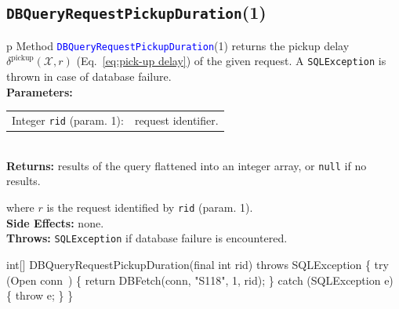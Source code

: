 \subsection{{\tt{}\protect{}DBQueryRequestPickupDuration}(1)}
\begin{tabular}{p{\textwidth}}
\toprule
{}
Method \textcolor{blue}{{\tt{}\protect{}DBQueryRequestPickupDuration}}(1) returns the
pickup delay $\delta^\textrm{pickup}(\mathcal{X},r)$
(Eq.~\ref{eq:pick-up delay}) of the given request.
A {\tt{}SQLException} is thrown in case of database failure.\\
\midrule
\textbf{Parameters:}\\
\begin{tabular}{lp{116mm}}
Integer {\tt{}rid} (param. 1):&request identifier.
\end{tabular}\\
\textbf{Returns:} results of the query flattened into an integer array,
or {\tt{}null} if no results.


where $r$ is the request identified by {\tt{}rid} (param. 1).\\
\textbf{Side Effects:} none.\\
\textbf{Throws:} {\tt{}SQLException} if database failure is encountered.\\
\bottomrule
\end{tabular}
\nwenddocs{}\endmoddef{}
int[] DBQueryRequestPickupDuration(final int rid) throws SQLException \{
  try (\LA{}Open \code{}conn\edoc{}~{\nwtagstyle{}}\RA{}) \{
    return DBFetch(conn, "S118", 1, rid);
  \} catch (SQLException e) \{
    throw e;
  \}
\}
\eatline
{}\nwendcode{}\nwdocspar

